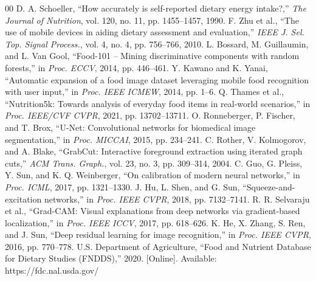 \documentclass[conference]{IEEEtran}
\begin{document}
\begin{thebibliography}{00}
 D. A. Schoeller, ``How accurately is self-reported dietary energy intake?,'' \textit{The Journal of Nutrition}, vol. 120, no. 11, pp. 1455--1457, 1990.
 F. Zhu et al., ``The use of mobile devices in aiding dietary assessment and evaluation,'' \textit{IEEE J. Sel. Top. Signal Process.}, vol. 4, no. 4, pp. 756--766, 2010.
 L. Bossard, M. Guillaumin, and L. Van Gool, ``Food-101 -- Mining discriminative components with random forests,'' in \textit{Proc. ECCV}, 2014, pp. 446--461.
 Y. Kawano and K. Yanai, ``Automatic expansion of a food image dataset leveraging mobile food recognition with user input,'' in \textit{Proc. IEEE ICMEW}, 2014, pp. 1--6.
 Q. Thames et al., ``Nutrition5k: Towards analysis of everyday food items in real-world scenarios,'' in \textit{Proc. IEEE/CVF CVPR}, 2021, pp. 13702--13711.
 O. Ronneberger, P. Fischer, and T. Brox, ``U-Net: Convolutional networks for biomedical image segmentation,'' in \textit{Proc. MICCAI}, 2015, pp. 234--241.
 C. Rother, V. Kolmogorov, and A. Blake, ``GrabCut: Interactive foreground extraction using iterated graph cuts,'' \textit{ACM Trans. Graph.}, vol. 23, no. 3, pp. 309--314, 2004.
 C. Guo, G. Pleiss, Y. Sun, and K. Q. Weinberger, ``On calibration of modern neural networks,'' in \textit{Proc. ICML}, 2017, pp. 1321--1330.
 J. Hu, L. Shen, and G. Sun, ``Squeeze-and-excitation networks,'' in \textit{Proc. IEEE CVPR}, 2018, pp. 7132--7141.
 R. R. Selvaraju et al., ``Grad-CAM: Visual explanations from deep networks via gradient-based localization,'' in \textit{Proc. IEEE ICCV}, 2017, pp. 618--626.
 K. He, X. Zhang, S. Ren, and J. Sun, ``Deep residual learning for image recognition,'' in \textit{Proc. IEEE CVPR}, 2016, pp. 770--778.
 U.S. Department of Agriculture, ``Food and Nutrient Database for Dietary Studies (FNDDS),'' 2020. [Online]. Available: https://fdc.nal.usda.gov/
\end{thebibliography}
\end{document}
